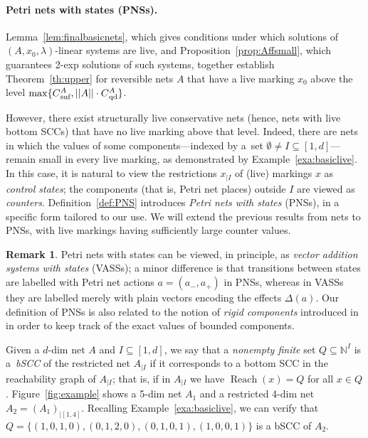\documentclass[11pt,a4paper]{amsart}
\DeclareMathOperator{\Reach}{Reach}
\newcommand{\nnorm}[1]{||#1||}
\newcommand{\suf}{{}_\textnormal{suf}}
\newcommand{\qd}{{}_\textnormal{qd}}
\newcommand{\Nat}{\mathbb{N}}
\newcommand{\restr}[1]{_{|{#1}}}
\newcommand{\setN}{\Nat}
\theoremstyle{plain}
\theoremstyle{definition}
\newtheorem{rem}[thm]{Remark}
\theoremstyle{defC}
\theoremstyle{thmC}
\begin{document}
\paragraph{Petri nets with states (PNSs).}
Lemma~\ref{lem:finalbasicnets}, which gives conditions under which 
solutions of $(A,x_0,\lambda)$-linear systems are live,
and Proposition~\ref{prop:Affsmall}, which guarantees 2-exp solutions of 
such systems, together establish Theorem~\ref{th:upper} 
for reversible nets $A$ that have a live marking $x_0$ above the
level $\max\{C\suf^A, \nnorm{A}\cdot C\qd^A\}$.

However, there exist structurally live conservative nets 
(hence, nets with live bottom SCCs)
that have no live marking above that level.
Indeed, there are nets in which the values of some 
components---indexed by a~set $\emptyset\neq I\subseteq[1,d]$---remain
small in every live marking, as demonstrated
by Example~\ref{exa:basiclive}.
In this case, it is natural to view the restrictions $x\restr{I}$ of
(live) markings $x$ as \emph{control states}; the components (that is,
Petri net places) outside $I$ are viewed as \emph{counters}.
Definition~\ref{def:PNS}
introduces \emph{Petri nets with
states} (PNSs), in a specific form tailored to our use.   
We will extend the previous results from nets to PNSs, with live
markings having sufficiently large counter values.

\begin{rem}
Petri nets with states can be viewed, in principle, 
as \emph{vector addition
	systems with states} (VASSs); a minor difference is 
	that transitions between states are
labelled with Petri net actions $a=(a_-,a_+)$ in PNSs, whereas in
	VASSs they are
	labelled merely with 
plain vectors encoding the effects $\Delta(a)$. 
	Our
	definition of PNSs is also related to the notion of
	\emph{rigid components} introduced in~\cite{DBLP:conf/stoc/Kosaraju82} in order to keep track 
	of the exact values of 
bounded components.
\end{rem}

\noindent
Given a $d$-dim net $A$ and $I\subseteq[1,d]$,
we say that a \emph{nonempty finite} set $Q\subseteq\setN^I$ is
a~\emph{bSCC} of the restricted net $A\restr{I}$
if it corresponds to a bottom SCC 
in the
reachability graph of $A\restr{I}$; that is, if in $A\restr{I}$ we have 
$\Reach(x)=Q$ for all $x\in Q$.
Figure~\ref{fig:example} shows a 5-dim net $A_1$ and a restricted 4-dim
 net
$A_2=(A_1)\restr{[1,4]}$. Recalling Example~\ref{exa:basiclive}, we
can verify that $Q=\{(1,0,1,0),(0,1,2,0),(0,1,0,1),(1,0,0,1)\}$ is a
bSCC of $A_2$.
\end{document}
